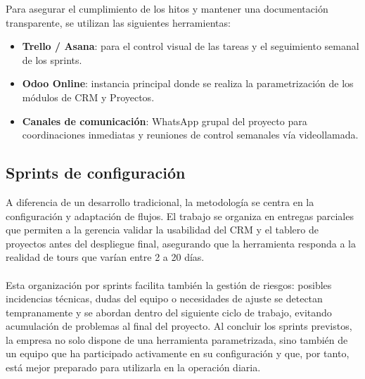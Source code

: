 \begin{indentedsubsection}
Para asegurar el cumplimiento de los hitos y mantener una documentación transparente, se utilizan las siguientes herramientas:

\begin{itemize}
    \item[a.] \textbf{Trello / Asana}: para el control visual de las tareas y el seguimiento semanal de los sprints.
    \item[b.] \textbf{Odoo Online}: instancia principal donde se realiza la parametrización de los módulos de CRM y Proyectos.
    \item[c.] \textbf{Canales de comunicación}: WhatsApp grupal del proyecto para coordinaciones inmediatas y reuniones de control semanales vía videollamada.
\end{itemize}

\end{indentedsubsection}

\subsection{Sprints de configuración}

\begin{indentedsubsection}
A diferencia de un desarrollo tradicional, la metodología se centra en la configuración y adaptación de flujos. El trabajo se organiza en entregas parciales que permiten a la gerencia validar la usabilidad del CRM y el tablero de proyectos antes del despliegue final, asegurando que la herramienta responda a la realidad de tours que varían entre 2 a 20 días.
\\
\\
Esta organización por sprints facilita también la gestión de riesgos: posibles incidencias técnicas, dudas del equipo o necesidades de ajuste se detectan tempranamente y se abordan dentro del siguiente ciclo de trabajo, evitando acumulación de problemas al final del proyecto. Al concluir los sprints previstos, la empresa no solo dispone de una herramienta parametrizada, sino también de un equipo que ha participado activamente en su configuración y que, por tanto, está mejor preparado para utilizarla en la operación diaria.

\end{indentedsubsection}

